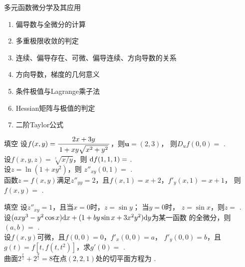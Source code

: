 \begin{frame}{多元函数微分学及其应用}
	\linespread{1.2}
	\begin{enumerate}
	  \item 偏导数与全微分的计算
	  \item 多重极限收敛的判定
	  \item 连续、偏导存在、可微、偏导连续、方向导数的关系
	  \item 方向导数，梯度的几何意义
	  \item 条件极值与Lagrange乘子法
	  \item Hessian矩阵与极值的判定
	  \item 二阶Taylor公式
	\end{enumerate}
\end{frame}

\begin{frame}{填空}
	\linespread{1.2}
	设$f(x,y)=\displaystyle\frac{\,{2x+3y}\,}{\,{1+xy\sqrt{x^2+y^2}}\,}$，则$\bm{u}=(2,3)$，
	则$D_uf(0,0)=$
	\underline{\;}.\\[1em]
	
	\pause\pause
	设$f(x,y,z)=\sqrt[z]{x/y}$，则
	$\mathrm{d} f(1,1,1)=$
	\underline{\;}.\\[1em]
	
	\pause\pause
	设$z=\ln(1+xy^2)$，则
	$z''_{xy}(0,1)=$
	\underline{\;}.\\[1em]
	
	\pause\pause
	函数$z=f(x,y)$满足$z''_{yy}=2$，且$f(x,1)=x+2$，$f'_y(x,1)=x+1$，
	则$f(x,y)=$
	\underline{\;}.
\end{frame}

\begin{frame}{填空}
	\linespread{1.2}
	设$z''_{xy}=1$，且当$x=0$时，$z=\sin y$； 当$y=0$时，
	$z=\sin x$，则$z=$
	\underline{\;}.\\[1em]
	
	\pause\pause
	设$(axy^3-y^2\cos x)\mathrm{d} x+(1+by\sin x+3x^2y^2)\mathrm{d} y$为某一函数
	的全微分，则$(a,b)=$
	\underline{\;}.\\[1em]
	
	\pause\pause
	设$f(x,y)$可微，且$f(0,0)=0$，$f'_x(0,0)=a$，
	$f'_y(0,0)=b$，且$g(t)=f[t,f(t,t^2)]$，求$g'(0)=$
	\underline{\;}.\\[1em]
	
	\pause\pause
	曲面$2^{\frac xz}+2^{\frac yz}=8$在点$(2,2,1)$处的切平面方程为
	\underline{\;}.
	
\end{frame}

